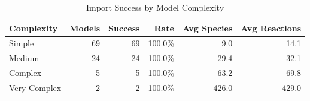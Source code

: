 \begin{table}[htbp]
\centering
\caption{Import Success by Model Complexity}
\label{tab:complexity-analysis}
\begin{tabular}{lrrrrr}
\toprule
\textbf{Complexity} & \textbf{Models} & \textbf{Success} & \textbf{Rate} & \textbf{Avg Species} & \textbf{Avg Reactions} \\
\midrule
Simple & 69 & 69 & 100.0\% & 9.0 & 14.1 \\
Medium & 24 & 24 & 100.0\% & 29.4 & 32.1 \\
Complex & 5 & 5 & 100.0\% & 63.2 & 69.8 \\
Very Complex & 2 & 2 & 100.0\% & 426.0 & 429.0 \\
\bottomrule
\end{tabular}
\end{table}
